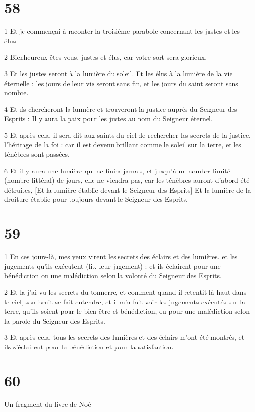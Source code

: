 \chapter{58}

\par 1 Et je commençai à raconter la troisième parabole concernant les justes et les élus.
\par 2 Bienheureux êtes-vous, justes et élus, car votre sort sera glorieux.
\par 3 Et les justes seront à la lumière du soleil. Et les élus à la lumière de la vie éternelle : les jours de leur vie seront sans fin, et les jours du saint seront sans nombre.
\par 4 Et ils chercheront la lumière et trouveront la justice auprès du Seigneur des Esprits : Il y aura la paix pour les justes au nom du Seigneur éternel.
\par 5 Et après cela, il sera dit aux saints du ciel de rechercher les secrets de la justice, l'héritage de la foi : car il est devenu brillant comme le soleil sur la terre, et les ténèbres sont passées.
\par 6 Et il y aura une lumière qui ne finira jamais, et jusqu'à un nombre limité (nombre littéral) de jours, elle ne viendra pas, car les ténèbres auront d'abord été détruites, [Et la lumière établie devant le Seigneur des Esprits] Et la lumière de la droiture établie pour toujours devant le Seigneur des Esprits.

\chapter{59}

\par 1 En ces jours-là, mes yeux virent les secrets des éclairs et des lumières, et les jugements qu'ils exécutent (lit. leur jugement) : et ils éclairent pour une bénédiction ou une malédiction selon la volonté du Seigneur des Esprits.
\par 2 Et là j'ai vu les secrets du tonnerre, et comment quand il retentit là-haut dans le ciel, son bruit se fait entendre, et il m'a fait voir les jugements exécutés sur la terre, qu'ils soient pour le bien-être et bénédiction, ou pour une malédiction selon la parole du Seigneur des Esprits.
\par 3 Et après cela, tous les secrets des lumières et des éclairs m'ont été montrés, et ils s'éclairent pour la bénédiction et pour la satisfaction.

\chapter{60} Un fragment du livre de Noé


